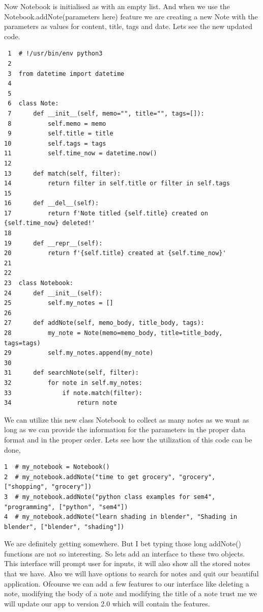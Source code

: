\documentclass[11pt]{article}
\begin{document}
Now Notebook is initialised as with an empty list. And when we use the Notebook.addNote(parameters here) feature we are creating a new Note with the parameters as values for content, title, tags and date. Lets see the new updated code.

\begin{verbatim}
 1  # !/usr/bin/env python3
 2  
 3  from datetime import datetime
 4  
 5  
 6  class Note:
 7      def __init__(self, memo="", title="", tags=[]):
 8          self.memo = memo
 9          self.title = title
10          self.tags = tags
11          self.time_now = datetime.now()
12  
13      def match(self, filter):
14          return filter in self.title or filter in self.tags
15  
16      def __del__(self):
17          return f'Note titled {self.title} created on {self.time_now} deleted!'
18  
19      def __repr__(self):
20          return f'{self.title} created at {self.time_now}'
21  
22  
23  class Notebook:
24      def __init__(self):
25          self.my_notes = []
26  
27      def addNote(self, memo_body, title_body, tags):
28          my_note = Note(memo=memo_body, title=title_body, tags=tags)
29          self.my_notes.append(my_note)
30  
31      def searchNote(self, filter):
32          for note in self.my_notes:
33              if note.match(filter):
34                  return note
\end{verbatim}

We can utilize this new class Notebook to collect as many notes as we want as long as we can provide the information for the parameters in the proper data format and in the proper order. Lets see how the utilization of this code can be done,

\begin{verbatim}
1  # my_notebook = Notebook()
2  # my_notebook.addNote("time to get grocery", "grocery", ["shopping", "grocery"])
3  # my_notebook.addNote("python class examples for sem4", "programming", ["python", "sem4"])
4  # my_notebook.addNote("learn shading in blender", "Shading in blender", ["blender", "shading"])
\end{verbatim}

We are definitely getting somewhere. But I bet typing those long addNote() functions are not so interesting. So lets add an interface to these two objects. This interface will prompt user for inputs, it will also show all the stored notes that we have. Also we will have options to search for notes and quit our beautiful application. Ofcourse we can add a few features to our interface like deleting a note, modifying the body of a note and modifying the title of a note trust me we will update our app to version 2.0 which will contain the features.
\end{document}
